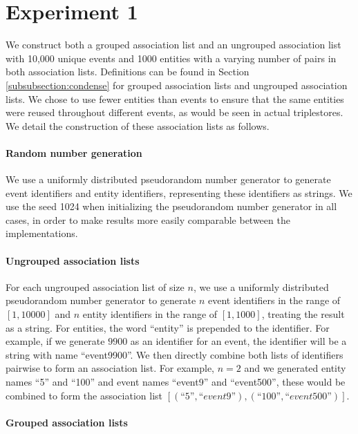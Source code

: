 \documentclass[../main.tex]{subfiles}
\begin{document}
\section{Experiment 1}

We construct both a grouped association list and an ungrouped association list with 10,000 unique events and 1000 entities with a varying number of pairs in both association lists.  Definitions can be found in Section \ref{subsubsection:condense} for grouped association lists and ungrouped association lists.  We chose to use fewer entities than events to ensure that the same entities were reused throughout different events, as would be seen in actual triplestores.  We detail the construction of these association lists as follows.

\paragraph{Random number generation}

We use a uniformly distributed pseudorandom number generator to generate event identifiers and entity identifiers, representing these identifiers as strings.  We use the seed 1024 when initializing the pseudorandom number generator in all cases, in order to make results more easily comparable between the implementations.  

\paragraph{Ungrouped association lists}

For each ungrouped association list of size $n$, we use a uniformly distributed pseudorandom number generator to generate $n$ event identifiers in the range of $[1, 10000]$ and $n$ entity identifiers in the range of $[1, 1000]$, treating the result as a string.  For entities, the word ``entity'' is prepended to the identifier.  For example, if we generate $9900$ as an identifier for an event, the identifier will be a string with name ``event9900''.  We then directly combine both lists of identifiers pairwise to form an association list.  For example, $n = 2$ and we generated entity names ``5'' and ``100'' and event names ``event9'' and ``event500'', these would be combined to form the association list $[(\text{``}5\text{''}, \text{``}event9\text{''}), (\text{``}100\text{''}, \text{``}event500\text{''})]$.

\paragraph{Grouped association lists}
\end{document}
